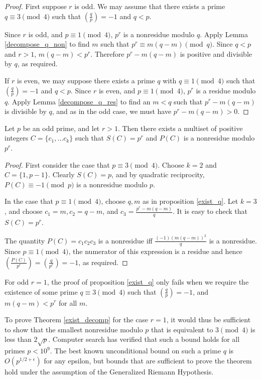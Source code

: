 \documentclass{article}
\begin{document}
\begin{proof}
  First suppose $r$ is odd. We may assume that there exists a prime
  $q \equiv 3 \pmod 4$ such that $\left( \frac{q}{p} \right) = -1$
  and $q < p$. 

  Since $r$ is odd, and $p \equiv 1 \pmod 4$, $p^r$ is a nonresidue
  modulo $q$. Apply Lemma \ref{decompose_q_non} to find $m$ such
  that $p^r \equiv m(q-m) \pmod q$. Since $q < p$ and $r > 1$,
  $m(q-m) < p^r$. Therefore $p^r - m(q-m)$ is positive and divisible
  by $q$, as required.

  If $r$ is even, we may suppose there exists a prime $q$ with $q
  \equiv 1 \pmod 4$ such that $\left( \frac{q}{p} \right) = -1$ and
  $q < p$. Since $r$ is even, and $p \equiv 1 \pmod 4$, $p^r$ is a
  residue modulo $q$. Apply Lemma \ref{decompose_q_res} to find an
  $m < q$ such that $p^r - m(q-m)$ is divisible by $q$, and as in
  the odd case, we must have $p^r - m(q-m) > 0$. 
\end{proof}
\begin{thm}
  \label{exist_decomp}
  Let $p$ be an odd prime, and let $r > 1$. Then there exists a
  multiset of positive integers $C = \{c_1, \ldots c_k\}$ such that
  $S(C) = p^r$ and $P(C)$ is a nonresidue modulo $p^r$.
\end{thm}
\begin{proof}
  First consider the case that $p \equiv 3 \pmod 4$. Choose $k = 2$
  and $C = \{1, p-1\}$. Clearly $S(C) = p$, and by quadratic
  reciprocity, $P(C) \equiv -1 \pmod p$ is a nonresidue modulo $p$.

  In the case that $p \equiv 1 \pmod 4$, choose $q,m$ as in
  proposition \ref{exist_q}. Let $k=3$, and choose $c_1 = m, c_2 =
  q-m$, and $c_3 = \frac{p^r - m(q-m)}{q}$. It is easy to check that
  $S(C) = p^r$.

  The quantity $P(C) = c_1c_2c_3$ is a nonresidue iff
  $\frac{(-1)(m(q-m))^2}{q}$ is a nonresidue. Since $p \equiv 1 \pmod
  4$, the numerator of this expression is a residue and hence $\left(
    \frac{P(C)}{p^r} \right) = \left( \frac{q}{p^r} \right) = -1$, as
  required.
\end{proof}

\begin{remark} For odd $r=1$, the proof of proposition \ref{exist_q}
  only fails when we require the existence of some prime $q \equiv 3
  \pmod 4$ such that $\left( \frac{q}{p} \right) = -1$, and $m(q-m) <
  p^r$ for all $m$.

  To prove Theorem \ref{exist_decomp} for the case $r=1$, it would
  thus be sufficient to show that the smallest nonresidue modulo $p$
  that is equivalent to $3 \pmod 4$ is less than $2\sqrt{p}$. Computer
  search has verified that such a bound holds for all primes $p <
  10^9$. The best known unconditional bound on such a prime $q$ is
  $O(p^{1/2 + \epsilon})$ for any epsilon, but bounds that are
  sufficient to prove the theorem hold under the assumption of the
  Generalized Riemann Hypothesis.
\end{remark}
\end{document}
